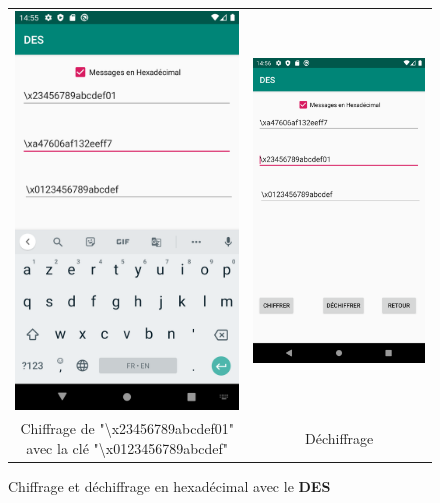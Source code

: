 \documentclass{article}
\begin{document}
\begin{figure}[b!]
    \centering
    \begin{tabular}{cc}
      \includegraphics[width=.35\linewidth]{./img/des_e_hex.png} &
      \includegraphics[width=.35\linewidth]{./img/des_d_hexa.png} \\
      Chiffrage de "\textbackslash x23456789abcdef01" avec la clé "\textbackslash x0123456789abcdef" & Déchiffrage \\
    \end{tabular}
    \caption{Chiffrage et déchiffrage en hexadécimal avec le \textbf{DES}}\label{fig:des_hex}
\end{figure}
\end{document}
